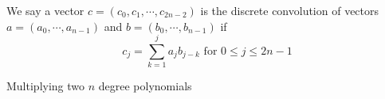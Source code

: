 \begin{definition}
  We say a vector $c = (c_0, c_1, \cdots, c_{2n - 2})$ is the discrete convolution
  of vectors $a = (a_0, \cdots, a_{n - 1})$ and $b = (b_0, \cdots, b_{n - 1})$ if 
  $$
  c_j = \sum_{k=1}^{j} a_j b_{j - k} \text{ for } 0 \leq j \leq 2n - 1
  $$ 
\end{definition}

\begin{lemma}
  Multiplying two $n$ degree polynomials 
\end{lemma}


